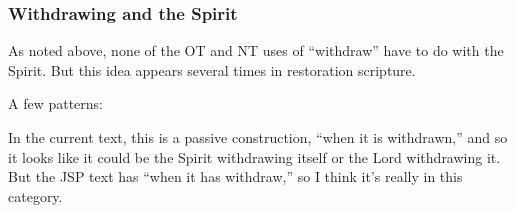		
	\subsubsection{Withdrawing and the Spirit}
		\label{WITHDRAW-spirit}
		
		As noted above, none of the OT and NT uses of ``withdraw'' have to do with the Spirit. But this idea appears several times in restoration scripture.
		
		A few patterns:
		
			\begin{compactdesc}
			
				\item[The Spirit withdrawing from people because of wickedness and/or refusing to repent] \phantom{.}
					\begin{compactitem}
						\item[{\hyperref[ALMA-34-35]{Alma 34:35}}]
						\item[{\hyperref[HELAMAN-4-24]{Helaman 4:24}}]
						\item[{\hyperref[HELAMAN-6-35]{Helaman 6:35}}]
						\item[{\hyperref[DC121-37]{DC 121:37}}] \phantom{.}
							\begin{compactitem}
								\item In the current text, this is a passive construction, ``when it is withdrawn,'' and so it looks like it could be the Spirit withdrawing itself or the Lord withdrawing it. But the JSP text has ``when it has withdraw,'' so I think it's really in this category.
							\end{compactitem}
						\item[{\hyperref[MOSES-1-15]{Moses 1:15}}]
					\end{compactitem}
					
				\item[The Lord withdrawing the Spirit from people because of refusing to repent] \phantom{.}
					\begin{compactitem}
						\item[{\hyperref[HELAMAN-13-8]{Helaman 13:8}}]
						\item[{\hyperref[DC19-20]{DC 19:20}}]
					\end{compactitem}
			
				\item[People withdrawing themselves from the Spirit by ignoring the commandments] \phantom{.}
					\begin{compactitem}
						\item[{\hyperref[MOSIAH-2-36]{Mosiah 2:36}}]
					\end{compactitem}
					

\end{compactdesc}
